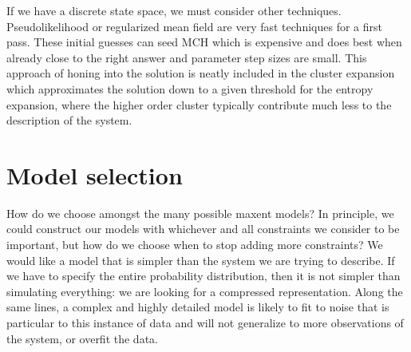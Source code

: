 \documentclass[aps,prl,twocolumn]{revtex4-1}
\begin{document}
If we have a discrete state space, we must consider other techniques. Pseudolikelihood or regularized mean field are very fast techniques for a first pass. These initial guesses can seed MCH which is expensive and does best when already close to the right answer and parameter step sizes are small. This approach of honing into the solution is neatly included in the cluster expansion which approximates the solution down to a given threshold for the entropy expansion, where the higher order cluster typically contribute much less to the description of the system. 

\section{Model selection}

How do we choose amongst the many possible maxent models? In principle, we could construct our models with whichever and all constraints we consider to be important, but how do we choose when to stop adding more constraints?
We would like a model that is simpler than the system we are trying to describe. If we have to specify the entire probability distribution, then it is not simpler than simulating everything: we are looking for a compressed representation. Along the same lines, a complex and highly detailed model is likely to fit to noise that is particular to this instance of data and will not generalize to more observations of the system, or overfit the data.
\end{document}
